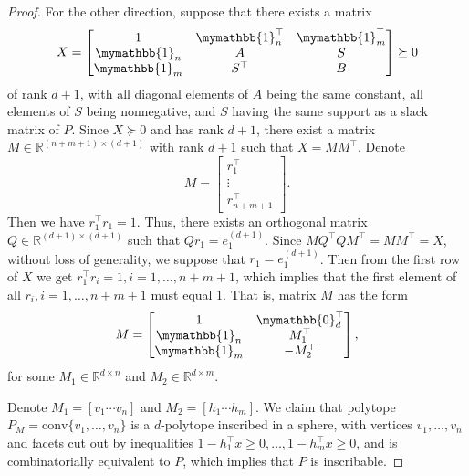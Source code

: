 \documentclass[smallextended, envcountsame]{svjour3}
\begin{document}
\begin{proof}
        For the other direction, suppose that there exists a matrix
        \begin{equation*}
            X = \begin{bmatrix}
                1 & \mymathbb{1}_n^\top & \mymathbb{1}_m^\top\\
                \mymathbb{1}_n & A & S\\
                \mymathbb{1}_m & S^\top & B
            \end{bmatrix} \succeq 0
        \end{equation*}
        of rank $d+1$, with all diagonal elements of $A$ being the same constant, all elements of $S$ being nonnegative, and $S$ having the same support as a slack matrix of $P$.  Since $X\succeq 0$ and has rank $d+1$, there exist a matrix $M\in\mathbb{R}^{(n+m+1)\times (d+1)}$ with rank $d+1$ such that $X=MM^\top$.  Denote 
        \begin{equation*}
            M = \begin{bmatrix}
                r_1^\top\\
                \vdots\\
                r_{n+m+1}^\top
            \end{bmatrix}.
        \end{equation*}
        Then we have $r_1^\top r_1=1$.  Thus, there exists an orthogonal matrix $Q\in\mathbb{R}^{(d+1)\times (d+1)}$ such that $Qr_1=e_1^{(d+1)}$.  Since $MQ^\top QM^\top=MM^\top=X$, without loss of generality, we suppose that $r_1=e_1^{(d+1)}$.  Then from the first row of $X$ we get $r_1^\top r_i=1,i=1,\ldots,n+m+1$, which implies that the first element of all $r_i,i=1,\ldots,n+m+1$ must equal 1.  That is, matrix $M$ has the form
        \begin{equation*}
            M = \begin{bmatrix}
                1 & \mymathbb{0}_d^\top\\
                \mymathbb{1}_n & M_1^\top\\
                \mymathbb{1}_m & -M_2^\top
            \end{bmatrix},
        \end{equation*}
        for some $M_1\in\mathbb{R}^{d\times n}$ and $M_2\in\mathbb{R}^{d\times m}$.  
        
        Denote $M_1=[v_1\cdots v_n]$ and $M_2=[h_1\cdots h_m]$.  We claim that polytope $P_M=\mathrm{conv}\{v_1,\ldots,v_n\}$ is a $d$-polytope inscribed in a sphere, with vertices $v_1,\ldots,v_n$ and facets cut out by inequalities $1-h_1^\top x\ge 0,\ldots,1-h_m^\top x\ge 0$, and is combinatorially equivalent to $P$, which implies that $P$ is inscribable.  
        

\end{proof}
\end{document}
